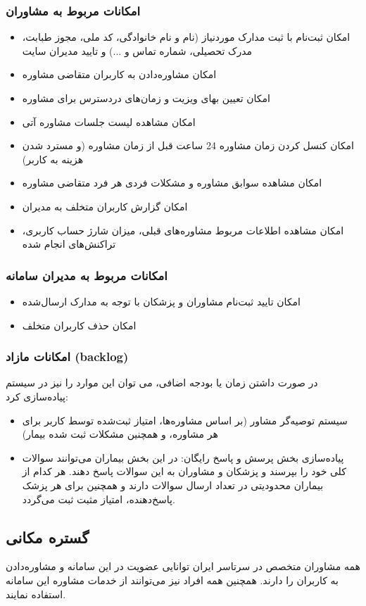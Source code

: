 \subsubsection{امکانات مربوط به مشاوران}
\begin{itemize}
    \item امکان ثبت‌نام با ثبت مدارک موردنیاز (نام و نام خانوادگی، کد ملی، مجوز طبابت، مدرک تحصیلی، شماره تماس و ...) و تایید مدیران سایت
	\item امکان مشاوره‌دادن به کاربران متقاضی مشاوره
	\item امکان تعیین بهای ویزیت و زمان‌های دردسترس برای مشاوره
	\item امکان مشاهده لیست جلسات مشاوره آتی
	\item امکان کنسل کردن زمان مشاوره 24 ساعت قبل از زمان مشاوره (و مسترد شدن هزینه به کاربر)
	\item امکان مشاهده سوابق مشاوره و مشکلات فردی هر فرد متقاضی مشاوره
	\item امکان گزارش کاربران متخلف به مدیران
	\item امکان مشاهده اطلاعات مربوط مشاوره‌های قبلی، میزان شارژ حساب کاربری، تراکنش‌های انجام شده
\end{itemize}

\subsubsection{امکانات مربوط به مدیران سامانه}
\begin{itemize}
\item امکان تایید ثبت‌نام مشاوران و پزشکان با توجه به مدارک ارسال‌شده
\item امکان حذف کاربران متخلف
\end{itemize}
\subsubsection{امکانات مازاد (backlog)}
در صورت داشتن زمان یا بودجه اضافی، می توان این موارد را نیز در سیستم پیاده‌سازی کرد:
\begin{itemize}
\item سیستم توصیه‌گر مشاور (بر اساس مشاوره‌ها، امتیاز ثبت‌شده توسط کاربر برای هر مشاوره، و همچنین مشکلات ثبت شده بیمار)
\item پیاده‌سازی بخش پرسش و پاسخ رایگان: در این بخش بیماران می‌توانند سوالات کلی خود را بپرسند و پزشکان و مشاوران به این سوالات پاسخ دهند. هر کدام از بیماران محدودیتی در تعداد ارسال سوالات دارند و همچنین برای هر پزشک پاسخ‌دهنده، امتیاز مثبت ثبت می‌گردد.
\end{itemize}

\subsection{گستره مکانی}
همه مشاوران متخصص در سرتاسر ایران توانایی عضویت در این سامانه و مشاوره‌دادن به کاربران را دارند. همچنین همه افراد نیز می‌‌توانند از خدمات مشاوره این سامانه استفاده نمایند.